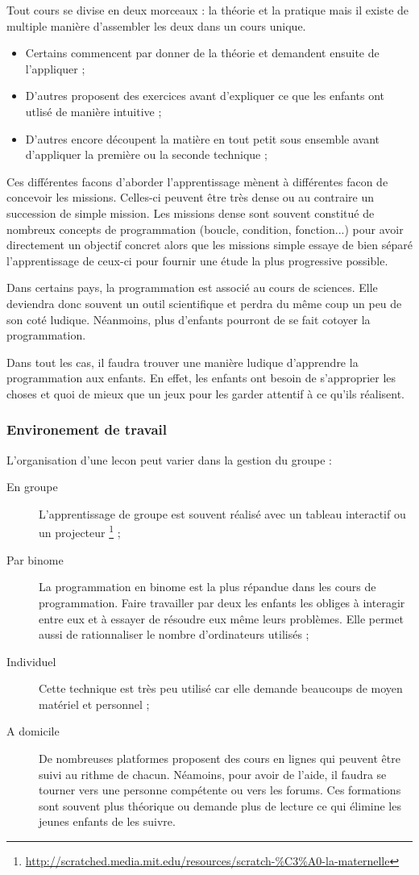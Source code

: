 Tout cours se divise en deux morceaux : la théorie et la pratique mais il existe de multiple manière d'assembler les deux dans un cours unique. 
\begin{itemize}
  \item Certains commencent par donner de la théorie et demandent ensuite de l'appliquer ;
  \item D'autres proposent des exercices avant d'expliquer ce que les enfants ont utlisé de manière intuitive ;
  \item D'autres encore découpent la matière en tout petit sous ensemble avant d'appliquer la première ou la seconde technique ;
\end{itemize}

Ces différentes facons d'aborder l'apprentissage mènent à différentes facon de concevoir les missions. Celles-ci peuvent être très dense ou au contraire un succession de simple mission. Les missions dense sont souvent constitué de nombreux concepts de programmation (boucle, condition, fonction...) pour avoir directement un objectif concret alors que les missions simple essaye de bien séparé l'apprentissage de ceux-ci pour fournir une étude la plus progressive possible.

Dans certains pays, la programmation est associé au cours de sciences. Elle deviendra donc souvent un outil scientifique et perdra du même coup un peu de son coté ludique. Néanmoins, plus d'enfants pourront de se fait cotoyer la programmation.

Dans tout les cas, il faudra trouver une manière ludique d'apprendre la programmation aux enfants. En effet, les enfants ont besoin de s'approprier les choses et quoi de mieux que un jeux pour les garder attentif à ce qu'ils réalisent.

\subsubsection{Environement de travail}
L'organisation d'une lecon peut varier dans la gestion du groupe :
\begin{description}
  \item[En groupe] L'apprentissage de groupe est souvent réalisé avec un tableau interactif ou un projecteur \footnote{\url{http://scratched.media.mit.edu/resources/scratch-\%C3\%A0-la-maternelle}} ;
  \item[Par binome] La programmation en binome est la plus répandue dans les cours de programmation. Faire travailler par deux les enfants les obliges à interagir entre eux et à essayer de résoudre eux même leurs problèmes. Elle permet aussi de rationnaliser le nombre d'ordinateurs utilisés ;
  \item[Individuel] Cette technique est très peu utilisé car elle demande beaucoups de moyen matériel et personnel ;
  \item[A domicile] De nombreuses platformes proposent des cours en lignes qui peuvent être suivi au rithme de chacun. Néamoins, pour avoir de l'aide, il faudra se tourner vers une personne compétente ou vers les forums. Ces formations sont souvent plus théorique ou demande plus de lecture ce qui élimine les jeunes enfants de les suivre.
\end{description}

